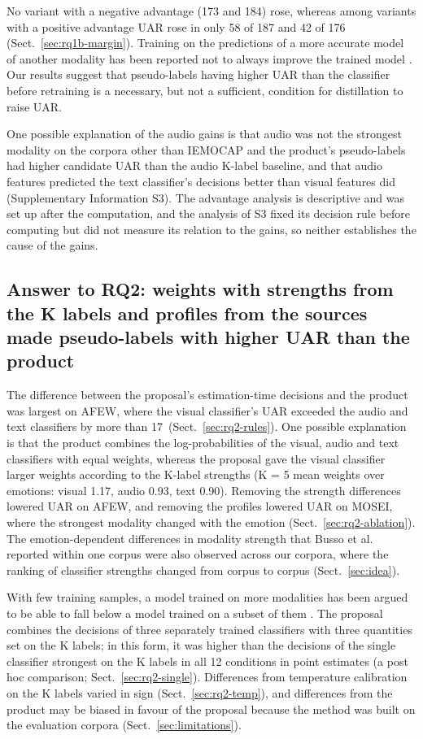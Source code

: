 No variant with a negative advantage (173 and 184) rose, whereas among variants with a positive advantage UAR rose in only 58 of 187 and 42 of 176 (Sect.~\ref{sec:rq1b-margin}). Training on the predictions of a more accurate model of another modality has been reported not to always improve the trained model \cite{xue2023mfh}. Our results suggest that pseudo-labels having higher UAR than the classifier before retraining is a necessary, but not a sufficient, condition for distillation to raise UAR.

One possible explanation of the audio gains is that audio was not the strongest modality on the corpora other than IEMOCAP and the product's pseudo-labels had higher candidate UAR than the audio K-label baseline, and that audio features predicted the text classifier's decisions better than visual features did (Supplementary Information S3). The advantage analysis is descriptive and was set up after the computation, and the analysis of S3 fixed its decision rule before computing but did not measure its relation to the gains, so neither establishes the cause of the gains.

\subsection{Answer to RQ2: weights with strengths from the K labels and profiles from the sources made pseudo-labels with higher UAR than the product}\label{sec:disc-rq2}
The difference between the proposal's estimation-time decisions and the product was largest on AFEW, where the visual classifier's UAR exceeded the audio and text classifiers by more than 17\pt\ (Sect.~\ref{sec:rq2-rules}). One possible explanation is that the product combines the log-probabilities of the visual, audio and text classifiers with equal weights, whereas the proposal gave the visual classifier larger weights according to the K-label strengths (K = 5 mean weights over emotions: visual 1.17, audio 0.93, text 0.90). Removing the strength differences lowered UAR on AFEW, and removing the profiles lowered UAR on MOSEI, where the strongest modality changed with the emotion (Sect.~\ref{sec:rq2-ablation}). The emotion-dependent differences in modality strength that Busso et al.\ \cite{busso2004} reported within one corpus were also observed across our corpora, where the ranking of classifier strengths changed from corpus to corpus (Sect.~\ref{sec:idea}).

With few training samples, a model trained on more modalities has been argued to be able to fall below a model trained on a subset of them \cite{huang2021}. The proposal combines the decisions of three separately trained classifiers with three quantities set on the K labels; in this form, it was higher than the decisions of the single classifier strongest on the K labels in all 12 conditions in point estimates (a post hoc comparison; Sect.~\ref{sec:rq2-single}). Differences from temperature calibration on the K labels varied in sign (Sect.~\ref{sec:rq2-temp}), and differences from the product may be biased in favour of the proposal because the method was built on the evaluation corpora (Sect.~\ref{sec:limitations}).

